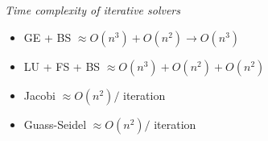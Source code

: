 \documentclass[10pt, AMS Euler]{article}
\begin{document}
\textit{Time complexity of iterative solvers}
\begin{itemize}
  \item GE + BS $\approx O(n^3) + O(n^2) \rightarrow O(n^3)$
  \item LU + FS + BS $\approx O(n^3) + O(n^2) + O(n^2)$
  \item Jacobi $\approx O(n^2) /$ iteration
  \item Guass-Seidel $\approx O(n^2) /$ iteration
\end{itemize}
\noindent \underline{\hspace{3in}}\\
\end{document}

